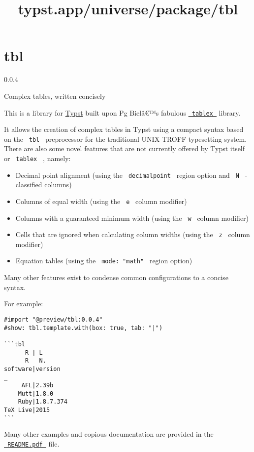 \title{typst.app/universe/package/tbl}

\label{banner}
\section{tbl}\label{tbl}

{ 0.0.4 }

Complex tables, written concisely

\label{readme}
This is a library for \href{https://typst.app/}{Typst} built upon Pg
Bielâ€™s fabulous
\href{https://github.com/PgBiel/typst-tablex}{\texttt{\ tablex\ }}
library.

It allows the creation of complex tables in Typst using a compact syntax
based on the \texttt{\ tbl\ } preprocessor for the traditional UNIX
TROFF typesetting system. There are also some novel features that are
not currently offered by Typst itself or \texttt{\ tablex\ } , namely:

\begin{itemize}
\tightlist
\item
  Decimal point alignment (using the \texttt{\ decimalpoint\ } region
  option and \texttt{\ N\ } -classified columns)
\item
  Columns of equal width (using the \texttt{\ e\ } column modifier)
\item
  Columns with a guaranteed minimum width (using the \texttt{\ w\ }
  column modifier)
\item
  Cells that are ignored when calculating column widths (using the
  \texttt{\ z\ } column modifier)
\item
  Equation tables (using the \texttt{\ mode:\ "math"\ } region option)
\end{itemize}

Many other features exist to condense common configurations to a concise
syntax.

For example:

\begin{verbatim}
#import "@preview/tbl:0.0.4"
#show: tbl.template.with(box: true, tab: "|")

```tbl
      R | L
      R   N.
software|version
_
     AFL|2.39b
    Mutt|1.8.0
    Ruby|1.8.7.374
TeX Live|2015
```
\end{verbatim}


Many other examples and copious documentation are provided in the
\href{https://maxre.es/tbl.typ/v0.0.4.pdf}{\texttt{\ README.pdf\ }}
file.

